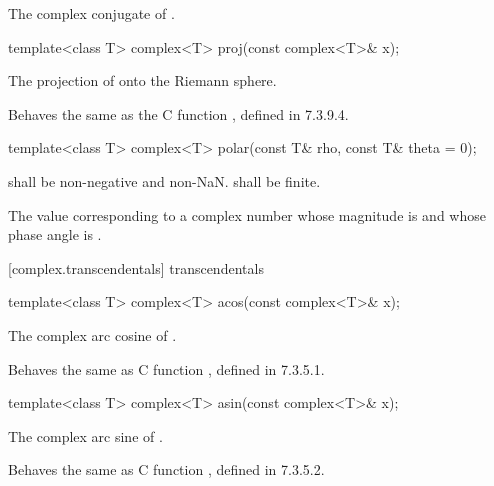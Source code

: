 \begin{itemdescr}
\pnum
\returns
The complex conjugate of .
\end{itemdescr}

%
\begin{itemdecl}
template<class T> complex<T> proj(const complex<T>& x);
\end{itemdecl}

\begin{itemdescr}
\pnum
\returns The projection of  onto the Riemann sphere.

\pnum
\remarks
Behaves the same as the C function , defined in 7.3.9.4.
\end{itemdescr}

%
\begin{itemdecl}
template<class T> complex<T> polar(const T& rho, const T& theta = 0);
\end{itemdecl}

\begin{itemdescr}
\pnum
\requires
{} shall be non-negative and non-NaN.  shall be finite.

\pnum
\returns
The
value corresponding
to a complex number whose magnitude is  and whose phase angle
is .
\end{itemdescr}

[complex.transcendentals]{ transcendentals}

%
%
\begin{itemdecl}
template<class T> complex<T> acos(const complex<T>& x);
\end{itemdecl}

\begin{itemdescr}
\pnum
\returns The complex arc cosine of .

\pnum
\remarks
Behaves the same as C function ,
defined in 7.3.5.1.
\end{itemdescr}

%
%
\begin{itemdecl}
template<class T> complex<T> asin(const complex<T>& x);
\end{itemdecl}

\begin{itemdescr}
\pnum
\returns The complex arc sine of .

\pnum
\remarks
Behaves the same as C function ,
defined in 7.3.5.2.
\end{itemdescr}

